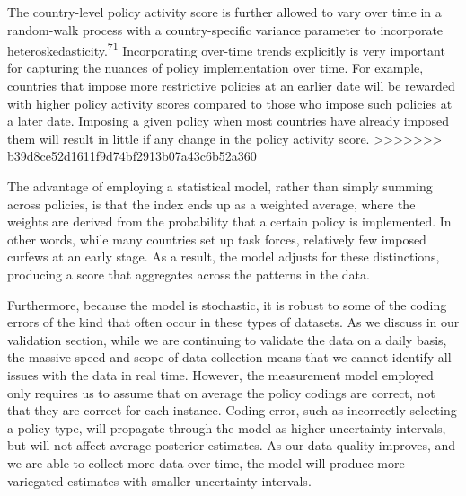 \documentclass[]{article}
\begin{document}
The country-level policy activity score is further allowed to vary over time in a random-walk process with a country-specific variance parameter to incorporate heteroskedasticity.\textsuperscript{71} Incorporating over-time trends explicitly is very important for capturing the nuances of policy implementation over time. For example, countries that impose more restrictive policies at an earlier date will be rewarded with higher policy activity scores compared to those who impose such policies at a later date. Imposing a given policy when most countries have already imposed them will result in little if any change in the policy activity score.
>>>>>>> b39d8ce52d1611f9d74bf2913b07a43c6b52a360

The advantage of employing a statistical model, rather than simply summing across policies, is that the index ends up as a weighted average, where the weights are derived from the probability that a certain policy is implemented. In other words, while many countries set up task forces, relatively few imposed curfews at an early stage. As a result, the model adjusts for these distinctions, producing a score that aggregates across the patterns in the data.

Furthermore, because the model is stochastic, it is robust to some of the coding errors of the kind that often occur in these types of datasets. As we discuss in our validation section, while we are continuing to validate the data on a daily basis, the massive speed and scope of data collection means that we cannot identify all issues with the data in real time. However, the measurement model employed only requires us to assume that on average the policy codings are correct, not that they are correct for each instance. Coding error, such as incorrectly selecting a policy type, will propagate through the model as higher uncertainty intervals, but will not affect average posterior estimates. As our data quality improves, and we are able to collect more data over time, the model will produce more variegated estimates with smaller uncertainty intervals.
\end{document}
